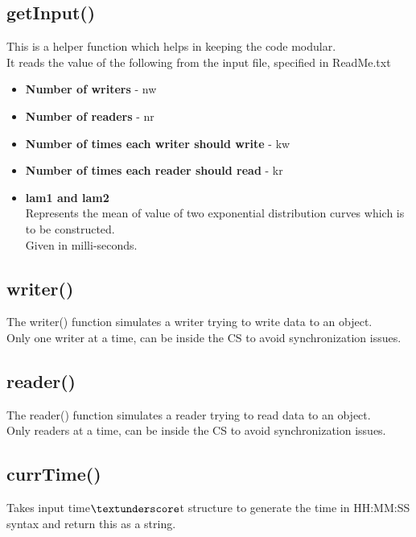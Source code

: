 \documentclass[12pt]{article}
\begin{document}
\subsection{getInput()}
This is a helper function which helps in keeping the code modular.\\
It reads the value of the following from the input file, specified in ReadMe.txt \\
\begin{itemize}
\item \textbf{Number of writers} - nw
\item \textbf{Number of readers} - nr\\
\item \textbf{Number of times each writer should write} - kw\\
\item \textbf{Number of times each reader should read} - kr\\
\item \textbf{lam1 and lam2}\\
Represents the mean of value of two exponential distribution curves which is to be constructed.\\
Given in milli-seconds.
\end{itemize}

\subsection{writer()}
The writer() function simulates a writer trying to write data to an object.\\
Only one writer at a time, can be inside the CS to avoid synchronization issues.
\subsection{reader()}
The reader() function simulates a reader trying to read data to an object.\\
Only readers at a time, can be inside the CS to avoid synchronization issues.

\subsection{currTime()}
Takes input time$\textunderscore$t structure to generate the time in HH:MM:SS syntax and return this as a string.
\end{document}
